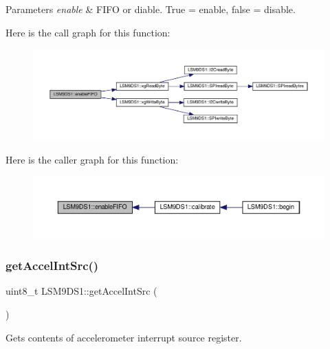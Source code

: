 \begin{DoxyParams}{Parameters}
{\em enable} & F\+I\+FO or diable. True = enable, false = disable. \\
\hline
\end{DoxyParams}
Here is the call graph for this function\+:\nopagebreak
\begin{figure}[H]
\begin{center}
\leavevmode
\includegraphics[width=350pt]{classLSM9DS1_a5f01141131318697838f15d7e5d10f2c_cgraph}
\end{center}
\end{figure}
Here is the caller graph for this function\+:\nopagebreak
\begin{figure}[H]
\begin{center}
\leavevmode
\includegraphics[width=350pt]{classLSM9DS1_a5f01141131318697838f15d7e5d10f2c_icgraph}
\end{center}
\end{figure}
\mbox{\label{classLSM9DS1_ae42ae3b368370f977d090ba0e53c7f5c}} 
\subsubsection{\texorpdfstring{get\+Accel\+Int\+Src()}{getAccelIntSrc()}}
{\footnotesize\ttfamily uint8\+\_\+t L\+S\+M9\+D\+S1\+::get\+Accel\+Int\+Src (\begin{DoxyParamCaption}{ }\end{DoxyParamCaption})}



Gets contents of accelerometer interrupt source register. 

